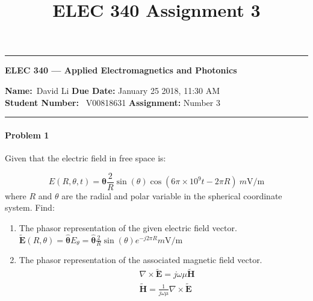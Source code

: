 \documentclass[12pt]{scrartcl}
\title{ELEC 340 Assignment 3}
\begin{document}
\begin{center}
	\hrule
	\vspace{.4cm}
	{\textbf { \large ELEC 340 --- Applied Electromagnetics and Photonics}}
\end{center}
{\textbf{Name:}\ David Li \hspace{\fill} \textbf{Due Date:} January 25 2018, 11:30 AM   \\
{ \textbf{Student Number:}} \ V00818631 \hspace{\fill} \textbf{Assignment:} Number 3 \\
	\hrule

\paragraph*{Problem 1} %
 Given that the electric field in free space is:

\[
E(R, \theta,t) = \hat{\mathbf{\theta}} \frac{2}{R} \sin(\theta) \cos(6 \pi \times 10^9 t - 2 \pi R) \ \si{m \volt / \meter}
\]
 where $R$ and $\theta$ are the radial and polar variable in the spherical coordinate system. Find:

\begin{enumerate}[label=(\alph*)]
\item The phasor representation of the given electric field vector. \newline 
$\tilde{\mathbf{E}}(R,\theta)=\hat{\mathbf{\theta}}E_\theta = \hat{\mathbf{\theta}}\frac{2}{R}\sin(\theta)e^{-j2\pi R} \si{m \volt / \meter}$
\item The phasor representation of the associated magnetic field vector. \newline 
\begin{align*}
& \nabla \times \tilde{\mathbf{E}} = j \omega \mu  \tilde{\mathbf{H}} \\
& \tilde{\mathbf{H}}=\frac{1}{j \omega \mu }  \nabla \times \tilde{\mathbf{E}}
\end{align*}


\end{enumerate}}
\end{document}
